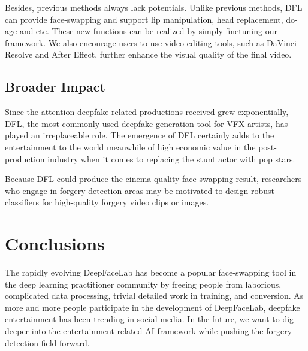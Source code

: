 \documentclass[10pt,twocolumn,letterpaper]{article}
\begin{document}
Besides, previous methods always lack potentials. Unlike previous methods, DFL can provide face-swapping and support lip manipulation, head replacement, do-age and etc. These new functions can be realized by simply finetuning our framework. We also encourage users to use video editing tools, such as DaVinci Resolve and After Effect, further enhance the visual quality of the final video.

\subsection{Broader Impact}


Since the attention deepfake-related productions received grew exponentially, DFL, the most commonly used deepfake generation tool for VFX artists, has played an irreplaceable role. The emergence of DFL certainly adds to the entertainment to the world meanwhile of high economic value in the post-production industry when it comes to replacing the stunt actor with pop stars. 

Because DFL could produce the cinema-quality face-swapping result, researchers who engage in forgery detection areas may be motivated to design robust classifiers for high-quality forgery video clips or images.

\section{Conclusions}
The rapidly evolving DeepFaceLab has become a popular face-swapping tool in the deep learning practitioner community by freeing people from laborious, complicated data processing, trivial detailed work in training, and conversion. As more and more people participate in the development of DeepFaceLab, deepfake entertainment has been trending in social media. In the future, we want to dig deeper into the entertainment-related AI framework while pushing the forgery detection field forward.


\clearpage
{\small


}
\end{document}
